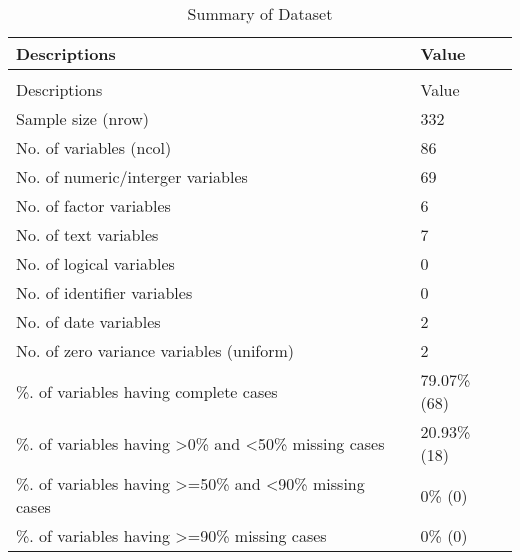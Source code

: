 \begingroup\fontsize{9}{11}\selectfont

\begin{longtable}[t]{ll}
\caption{Summary of Dataset}\\
\toprule
Descriptions & Value\\
\midrule
\endfirsthead
\caption[]{Summary of Dataset }\\
\toprule
Descriptions & Value\\
\midrule
\endhead

\endfoot
\bottomrule
\endlastfoot
Sample size (nrow) & 332\\
No. of variables (ncol) & 86\\
No. of numeric/interger variables & 69\\
No. of factor variables & 6\\
No. of text variables & 7\\
No. of logical variables & 0\\
No. of identifier variables & 0\\
No. of date variables & 2\\
No. of zero variance variables (uniform) & 2\\
\%. of variables having complete cases & 79.07\% (68)\\
\%. of variables having >0\% and <50\% missing cases & 20.93\% (18)\\
\%. of variables having >=50\% and <90\% missing cases & 0\% (0)\\
\%. of variables having >=90\% missing cases & 0\% (0)\\*
\end{longtable}
\endgroup{}
